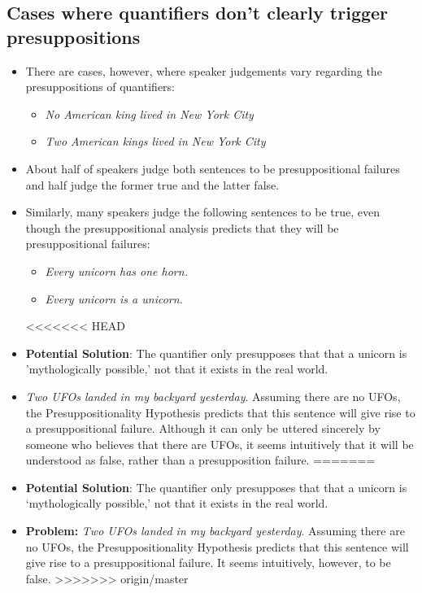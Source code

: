 \documentclass[a4paper]{article}
\begin{document}
\subsection{Cases where quantifiers don't clearly trigger presuppositions}
\begin{itemize}
\item There are cases, however, where speaker judgements vary regarding the presuppositions of quantifiers:
\begin{itemize}
\item \emph{No American king lived in New York City}
\item \emph{Two American kings lived in New York City}
\end{itemize}
\item About half of speakers judge both sentences to be presuppositional failures and half judge the former true and the latter false.
\item Similarly, many speakers judge the following sentences to be true, even though the presuppositional analysis predicts that they will be presuppositional failures:
\begin{itemize}
\item \emph{Every unicorn has one horn.}
\item \emph{Every unicorn is a unicorn.}
\end{itemize}
<<<<<<< HEAD
\item \textbf{Potential Solution}: The quantifier only presupposes that that a unicorn is 'mythologically possible,' not that it exists in the real world. 
\item \emph{Two UFOs landed in my backyard yesterday}. Assuming there are no UFOs, the Presuppositionality Hypothesis predicts that this sentence will give rise to a presuppositional failure. Although it can only be uttered sincerely by someone who believes that there are UFOs, it seems intuitively that it will be understood as false, rather than a presupposition failure.
=======
\item \textbf{Potential Solution}: The quantifier only presupposes that that a unicorn is `mythologically possible,' not that it exists in the real world.
\item \textbf{Problem:} \emph{Two UFOs landed in my backyard yesterday}. Assuming there are no UFOs, the Presuppositionality Hypothesis predicts that this sentence will give rise to a presuppositional failure. It seems intuitively, however, to be false.
>>>>>>> origin/master
\end{itemize}
\end{document}
